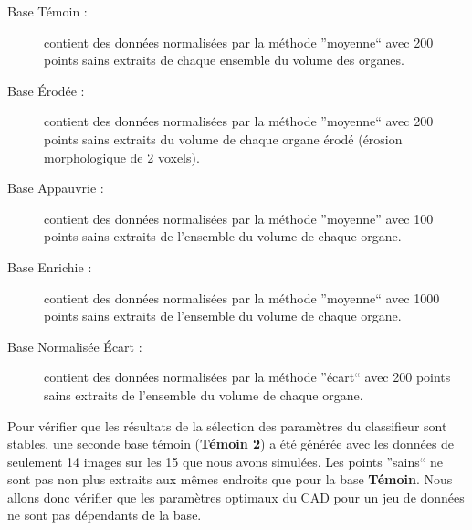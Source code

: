 \begin{description}
 \item[Base Témoin : ] contient des données normalisées par la méthode ''moyenne`` avec 200 points sains extraits de chaque ensemble du volume des organes.
 \item[Base Érodée : ] contient des données normalisées par la méthode ''moyenne`` avec 200 points sains extraits du volume de chaque organe érodé (érosion morphologique de 2 voxels).
 \item[Base Appauvrie : ] contient des données normalisées par la méthode ''moyenne'' avec 100 points sains extraits de l'ensemble du volume de chaque organe.
 \item[Base Enrichie : ] contient des données normalisées par la méthode ''moyenne`` avec 1000 points sains extraits de l'ensemble du volume de chaque organe.
 \item[Base Normalisée \'Ecart : ] contient des données normalisées par la méthode ''écart`` avec 200 points sains extraits de l'ensemble du volume de chaque organe.
\end{description}

Pour vérifier que les résultats de la sélection des paramètres du classifieur sont stables, une seconde base témoin (\textbf{Témoin 2}) a été générée avec les données de seulement 14 images sur les 15 que nous avons simulées. Les points ''sains`` ne sont pas non plus extraits aux mêmes endroits que pour la base \textbf{Témoin}. Nous allons donc vérifier que les paramètres optimaux du CAD pour un jeu de données ne sont pas dépendants de la base.


